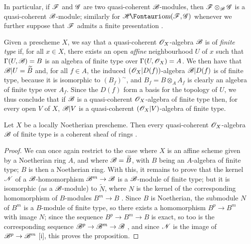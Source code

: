 In particular, if $\mathscr{F}$ and $\mathscr{G}$ are two quasi-coherent $\mathscr{B}$-modules, then $\mathscr{F}\otimes_{\mathscr{B}}\mathscr{G}$ is a quasi-coherent $\mathscr{B}$-module; similarly for $\shHom(\sh{F},\sh{G})$ whenever we further suppose that $\mathscr{F}$ admits a finite presentation .

\begin{env}[9.6.2]
\label{I.9.6.2}
Given a prescheme $X$, we say that a quasi-coherent $\mathscr{O}_X$-algebra $\mathscr{B}$ is of \emph{finite type} if, for all $x\in X$, there exists an open \emph{affine} neighbourhood $U$ of $x$ such that $\Gamma(U,\mathscr{B})=B$ is an algebra of finite type over $\Gamma(U,\mathscr{O}_X)=A$.
We then have that $\mathscr{B}|U=\widetilde{B}$ and, for all $f\in A$, the induced $(\mathscr{O}_X|D(f))$-algebra $\mathscr{B}|D(f)$ is of finite type, because it is isomorphic to $(B_f)^{\sim}$, and $B_f=B\otimes_A A_f$ is clearly an algebra of finite type over $A_f$.
Since the $D(f)$ form a basis for the topology of $U$, we thus conclude that if $\mathscr{B}$ is a quasi-coherent $\mathscr{O}_X$-algebra of finite type then, for every open $V$ of $X$, $\mathscr{B}|V$ is a quasi-coherent $(\mathscr{O}_X|V)$-algebra of finite type.
\end{env}

\begin{proposition}[9.6.3]
\label{I.9.6.3}
Let $X$ be a locally Noetherian prescheme.
Then every quasi-coherent $\mathscr{O}_X$-algebra $\mathscr{B}$ of finite type is a coherent sheaf of rings .
\end{proposition}

\begin{proof}
We can once again restrict to the case where $X$ is an affine scheme given by a Noetherian ring $A$, and where $\mathscr{B}=\widetilde{B}$, with $B$ being an $A$-algebra of finite type; $B$ is then a Noetherian ring.
With this, it remains to prove that the kernel $\mathscr{N}$ of a $\mathscr{B}$-homomorphism $\sh{B}^m\to\sh{B}$ is a $\mathscr{B}$-module
of finite type; but it is isomorphic (as a $\mathscr{B}$-module) to $\widetilde{N}$, where $N$ is the kernel of the corresponding homomorphism of $B$-modules $B^m\to B$ .
Since $B$ is Noetherian, the submodule $N$ of $B^m$ is a $B$-module of finite type, so there exists a homomorphism $B^p\to B^m$ with image $N$; since the sequence $B^p\to B^m\to B$ is exact, so too is the corresponding sequence $\sh{B}^p\to\sh{B}^m\to\sh{B}$ , and since $\mathscr{N}$ is the image of $\sh{B}^p\to\sh{B}^m$ [i], this proves the proposition.
\end{proof}

